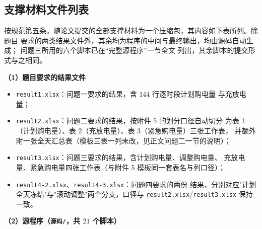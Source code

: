 \documentclass[withoutpreface,bwprint]{cumcmthesis}
\begin{document}
\begin{appendices}
\newpage
\section{支撑材料文件列表}

按规范第五条，随论文提交的全部支撑材料为一个压缩包，其内容如下表所列。除题目
要求的两类结果文件外，其余均为程序的中间与最终输出，均由源码自动生成；
问题三所用的六个脚本已在“完整源程序”一节全文
列出，其余脚本的提交形式与之相同。

\textbf{（1）题目要求的结果文件}

\begin{itemize}
  \item \texttt{result1.xlsx}：问题一要求的结果，含 $144$ 行逐时段计划购电量
        与充放电量；
  \item \texttt{result2.xlsx}：问题二要求的结果，按附件 5 的划分口径自动切分
        为表 1（计划购电量）、表 2（充放电量）、表 3（紧急购电量）三张工作表，
        并额外附一张全天汇总表（模板三表一列未改，见正文问题二一节的说明）；
  \item \texttt{result3.xlsx}：问题三要求的结果，含计划购电量、调整购电量、
        充放电量、紧急购电量四张工作表（与附件 5 模板同一套表名与列口径）；
  \item \texttt{result4-2.xlsx}、\texttt{result4-3.xlsx}：问题四要求的两份
        结果，分别对应"计划全天冻结"与"滚动调整"两个分支，口径与
        \texttt{result2.xlsx}/\texttt{result3.xlsx} 保持一致。
\end{itemize}

\textbf{（2）源程序（\texttt{源码/}，共 $21$ 个脚本）}


\end{appendices}
\end{document}
